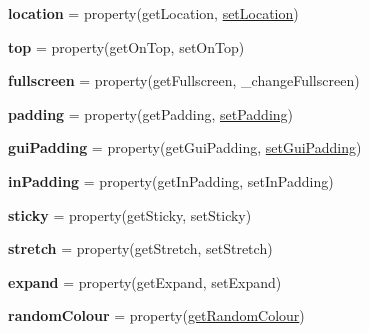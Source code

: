 \begin{DoxyCompactItemize}
\item 
\mbox{\label{classappjar_1_1gui_a24c659121729631e8fcd35999ffcc88b}} 
{\bfseries location} = property(get\+Location, \hyperlink{classappjar_1_1gui_ac8a8c2c4163d7ccb10d7749d6637046c}{set\+Location})
\item 
\mbox{\label{classappjar_1_1gui_a78ab4f3d2745a3af82e0361bd474a503}} 
{\bfseries top} = property(get\+On\+Top, set\+On\+Top)
\item 
\mbox{\label{classappjar_1_1gui_afd240a4c86eb42babb1f0f98d6ad2fc8}} 
{\bfseries fullscreen} = property(get\+Fullscreen, \+\_\+change\+Fullscreen)
\item 
\mbox{\label{classappjar_1_1gui_a485cb485a284c5afe04c63606c55f703}} 
{\bfseries padding} = property(get\+Padding, \hyperlink{classappjar_1_1gui_a986ce814d62f922393612466c04a7236}{set\+Padding})
\item 
\mbox{\label{classappjar_1_1gui_af2d9eaa6fd763008e085b4216cd0433f}} 
{\bfseries gui\+Padding} = property(get\+Gui\+Padding, \hyperlink{classappjar_1_1gui_aa421d6c507945907169e871f36489fe4}{set\+Gui\+Padding})
\item 
\mbox{\label{classappjar_1_1gui_a27a96b762221543d706b06eb6ad97a29}} 
{\bfseries in\+Padding} = property(get\+In\+Padding, set\+In\+Padding)
\item 
\mbox{\label{classappjar_1_1gui_a098ca80739b0a3ead17b914c6bca4d46}} 
{\bfseries sticky} = property(get\+Sticky, set\+Sticky)
\item 
\mbox{\label{classappjar_1_1gui_a0c4c6994566639c51a7d6a951879a8f1}} 
{\bfseries stretch} = property(get\+Stretch, set\+Stretch)
\item 
\mbox{\label{classappjar_1_1gui_ac616c6ce9a42d7f43458be3ac797d28d}} 
{\bfseries expand} = property(get\+Expand, set\+Expand)
\item 
\mbox{\label{classappjar_1_1gui_a49aa6e80468e0d925d45add7861a990c}} 
{\bfseries random\+Colour} = property(\hyperlink{classappjar_1_1gui_abab8897e9d736a72a96a6d87aa2516e8}{get\+Random\+Colour})

\end{DoxyCompactItemize}

